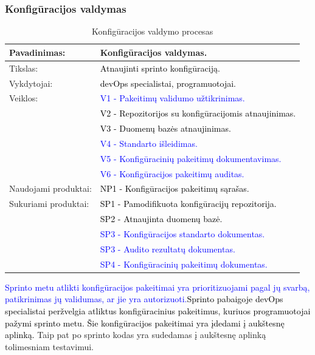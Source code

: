 \documentclass{VUMIFPSkursinis}
\begin{document}
	\subsubsection{Konfigūracijos valdymas}
	\begin{center}
		\begin{table}[ht]
			\caption{Konfigūracijos valdymo procesas}
			\begin{tabular}{ | l | l | }
				\hline
				Pavadinimas:         & Konfigūracijos valdymas.				\\ \hline
				Tikslas:             & \textcolor{black}{Atnaujinti sprinto konfigūraciją.}			\\ \hline
				Vykdytojai:          & \textcolor{black}{devOps specialistai, programuotojai.}			\\ \hline
				Veiklos:             	& \textcolor{blue}{V1 - Pakeitimų validumo užtikrinimas.	}		\\ \hline
														& \textcolor{black}{V2 - Repozitorijos su konfigūracijomis atnaujinimas.}	\\
														 & \textcolor{black}{V3 - Duomenų bazės atnaujinimas.	}		\\ \hline
														 & \textcolor{blue}{V4 - Standarto išleidimas.	}		\\ \hline
														 & \textcolor{blue}{V5 - Konfigūracinių pakeitimų dokumentavimas.	}		\\ \hline
														 & \textcolor{blue}{V6 - Konfigūracijos pakeitimų auditas.	}		\\ \hline
				Naudojami produktai: & \textcolor{black}{NP1 - Konfigūracijos pakeitimų sąrašas.	}	\\ \hline
				Sukuriami produktai: & \textcolor{black}{SP1 - Pamodifikuota konfigūracijų repozitorija. }	\\
														 & \textcolor{black}{SP2 - Atnaujinta duomenų bazė. }			\\ \hline
														 & \textcolor{blue}{SP3 - Konfigūracijos standarto dokumentas. }			\\ \hline
														 & \textcolor{blue}{SP3 - Audito rezultatų dokumentas. }			\\ \hline
														 & \textcolor{blue}{SP4 - Konfigūracinių pakeitimų dokumentas. }			\\ \hline
			\end{tabular}
		\end{table}
	\end{center}
		\textcolor{blue}{Sprinto metu atlikti konfigūracijos pakeitimai yra prioritizuojami pagal jų svarbą, patikrinimas jų validumas, ar jie yra autorizuoti.}\textcolor{black}{Sprinto pabaigoje devOps specialistai peržvelgia atliktus konfigūracinius pakeitimus, kuriuos programuotojai pažymi sprinto metu.
		Šie konfigūracijos pakeitimai yra įdedami į aukštesnę aplinką.} Taip pat po sprinto kodas yra sudedamas į aukštesnę aplinką tolimesniam testavimui.
\end{document}
